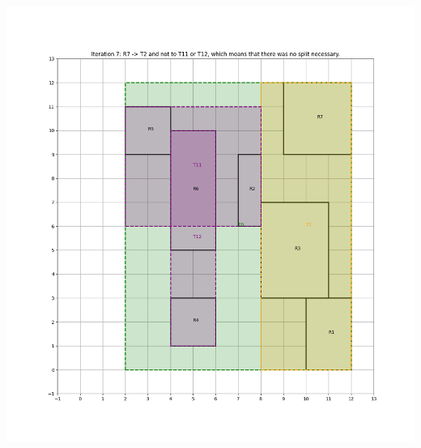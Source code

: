 \begin{center}
        \includegraphics[scale=0.5]{./A1 figs/iter7.png}
    \end{center}
\pagebreak
